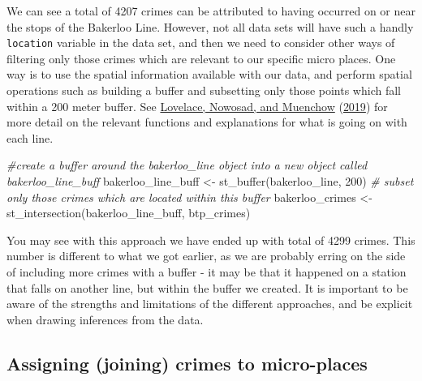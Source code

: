 \documentclass[
  krantz2]{krantz}
\makeatletter
\newenvironment{Shaded}{\begin{snugshade}}{\end{snugshade}}
\newcommand{\CommentTok}[1]{\textcolor[rgb]{0.37,0.37,0.37}{\textit{#1}}}
\newcommand{\DecValTok}[1]{\textcolor[rgb]{0.06,0.06,0.06}{#1}}
\newcommand{\FunctionTok}[1]{\textcolor[rgb]{0,0,0}{#1}}
\newcommand{\NormalTok}[1]{#1}
\newcommand{\OtherTok}[1]{\textcolor[rgb]{0.37,0.37,0.37}{#1}}
\newenvironment{kframe}{%
\medskip{}
\setlength{\fboxsep}{.8em}
 \def\at@end@of@kframe{}%
 \ifinner\ifhmode%
  \def\at@end@of@kframe{\end{minipage}}%
  \begin{minipage}{\columnwidth}%
 \fi\fi%
 \def\FrameCommand##1{\hskip\@totalleftmargin \hskip-\fboxsep
 \colorbox{shadecolor}{##1}\hskip-\fboxsep
     \hskip-\linewidth \hskip-\@totalleftmargin \hskip\columnwidth}%
 \MakeFramed {\advance\hsize-\width
   \@totalleftmargin\z@ \linewidth\hsize
   \@setminipage}}%
 {\par\unskip\endMakeFramed%
 \at@end@of@kframe}
\renewenvironment{Shaded}{\begin{kframe}}{\end{kframe}}
\makeatother
\begin{document}
We can see a total of 4207 crimes can be attributed to having occurred on or near the stops of the Bakerloo Line. However, not all data sets will have such a handly \texttt{location} variable in the data set, and then we need to consider other ways of filtering only those crimes which are relevant to our specific micro places. One way is to use the spatial information available with our data, and perform spatial operations such as building a buffer and subsetting only those points which fall within a 200 meter buffer. See \protect\hyperlink{ref-Lovelace_2019}{Lovelace, Nowosad, and Muenchow} (\protect\hyperlink{ref-Lovelace_2019}{2019}) for more detail on the relevant functions and explanations for what is going on with each line.

\begin{Shaded}
\begin{Highlighting}[]
\CommentTok{\#create a buffer around the bakerloo\_line object into a new object called bakerloo\_line\_buff}
\NormalTok{bakerloo\_line\_buff }\OtherTok{\textless{}{-}} \FunctionTok{st\_buffer}\NormalTok{(bakerloo\_line, }\DecValTok{200}\NormalTok{)}
\CommentTok{\# subset only those crimes which are located within this buffer}
\NormalTok{bakerloo\_crimes }\OtherTok{\textless{}{-}} \FunctionTok{st\_intersection}\NormalTok{(bakerloo\_line\_buff, btp\_crimes)}
\end{Highlighting}
\end{Shaded}

You may see with this approach we have ended up with total of 4299 crimes. This number is different to what we got earlier, as we are probably erring on the side of including more crimes with a buffer - it may be that it happened on a station that falls on another line, but within the buffer we created. It is important to be aware of the strengths and limitations of the different approaches, and be explicit when drawing inferences from the data.

\hypertarget{assigning-joining-crimes-to-micro-places}{%
\subsection{Assigning (joining) crimes to micro-places}\label{assigning-joining-crimes-to-micro-places}}
\end{document}
